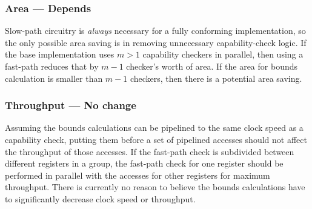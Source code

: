 



\subsubsection*{Area --- Depends}
Slow-path circuitry is \emph{always} necessary for a fully conforming implementation, so the only possible area saving is in removing unnecessary capability-check logic.
If the base implementation uses $m > 1$ capability checkers in parallel, then using a fast-path reduces that by $m - 1$ checker's worth of area.
If the area for bounds calculation is smaller than $m - 1$ checkers, then there is a potential area saving.


\subsubsection*{Throughput --- No change}
Assuming the bounds calculations can be pipelined to the same clock speed as a capability check, putting them before a set of pipelined accesses should not affect the throughput of those accesses.
If the fast-path check is subdivided between different registers in a group, the fast-path check for one register should be performed in parallel with the accesses for other registers for maximum throughput.
There is currently no reason to believe the bounds calculations have to significantly decrease clock speed or throughput.

